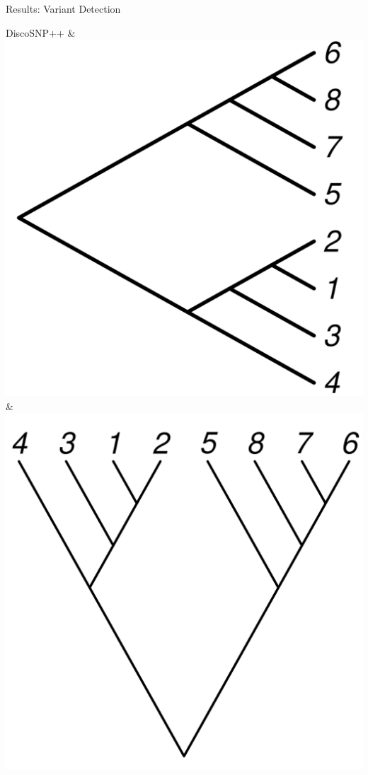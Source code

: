 \documentclass{beamer}
\begin{document}
\begin{frame}{}
\begin{columns}
\begin{block}{Results: Variant Detection}
\begin{center}
\begin{tabu}
 DiscoSNP++ & \includegraphics[width=.95\linewidth]{disco_tree_rightwards.pdf} & \includegraphics[width=.95\linewidth,angle=90]{true_tree.pdf}
\end{tabu}
\end{center}


\end{block}
\end{columns}
\end{frame}
\end{document}
